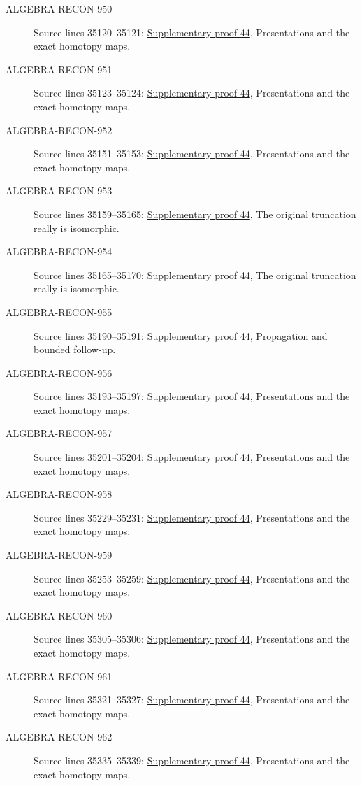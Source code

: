 \begin{description}
\item[ALGEBRA-RECON-950] Source lines 35120--35121: \hyperlink{algebra_naive_cotangent_notes_20260928}{Supplementary proof 44}, Presentations and the exact homotopy maps.
\item[ALGEBRA-RECON-951] Source lines 35123--35124: \hyperlink{algebra_naive_cotangent_notes_20260928}{Supplementary proof 44}, Presentations and the exact homotopy maps.
\item[ALGEBRA-RECON-952] Source lines 35151--35153: \hyperlink{algebra_naive_cotangent_notes_20260928}{Supplementary proof 44}, Presentations and the exact homotopy maps.
\item[ALGEBRA-RECON-953] Source lines 35159--35165: \hyperlink{algebra_naive_cotangent_notes_20260928}{Supplementary proof 44}, The original truncation really is isomorphic.
\item[ALGEBRA-RECON-954] Source lines 35165--35170: \hyperlink{algebra_naive_cotangent_notes_20260928}{Supplementary proof 44}, The original truncation really is isomorphic.
\item[ALGEBRA-RECON-955] Source lines 35190--35191: \hyperlink{algebra_naive_cotangent_notes_20260928}{Supplementary proof 44}, Propagation and bounded follow-up.
\item[ALGEBRA-RECON-956] Source lines 35193--35197: \hyperlink{algebra_naive_cotangent_notes_20260928}{Supplementary proof 44}, Presentations and the exact homotopy maps.
\item[ALGEBRA-RECON-957] Source lines 35201--35204: \hyperlink{algebra_naive_cotangent_notes_20260928}{Supplementary proof 44}, Presentations and the exact homotopy maps.
\item[ALGEBRA-RECON-958] Source lines 35229--35231: \hyperlink{algebra_naive_cotangent_notes_20260928}{Supplementary proof 44}, Presentations and the exact homotopy maps.
\item[ALGEBRA-RECON-959] Source lines 35253--35259: \hyperlink{algebra_naive_cotangent_notes_20260928}{Supplementary proof 44}, Presentations and the exact homotopy maps.
\item[ALGEBRA-RECON-960] Source lines 35305--35306: \hyperlink{algebra_naive_cotangent_notes_20260928}{Supplementary proof 44}, Presentations and the exact homotopy maps.
\item[ALGEBRA-RECON-961] Source lines 35321--35327: \hyperlink{algebra_naive_cotangent_notes_20260928}{Supplementary proof 44}, Presentations and the exact homotopy maps.
\item[ALGEBRA-RECON-962] Source lines 35335--35339: \hyperlink{algebra_naive_cotangent_notes_20260928}{Supplementary proof 44}, Presentations and the exact homotopy maps.

\end{description}
